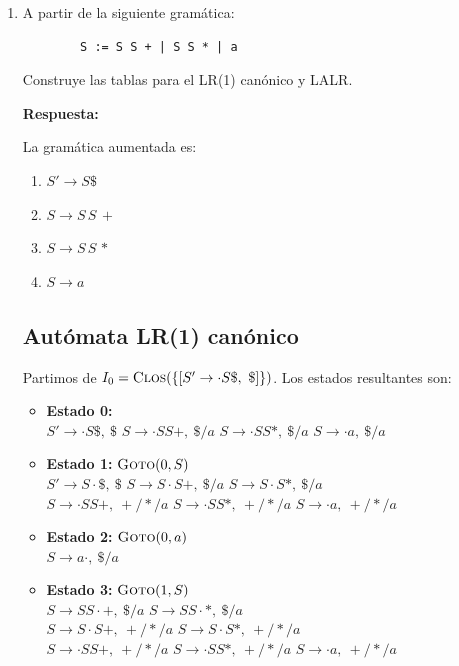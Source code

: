 \documentclass[12pt, letterpaper]{article}
\begin{document}
\begin{enumerate}
    \item A partir de la siguiente gramática:
    \begin{verbatim}
        S := S S + | S S * | a
    \end{verbatim}
    Construye las tablas para el LR(1) canónico y LALR.

    \textbf{Respuesta:}

La gramática aumentada es:
\begin{enumerate}[label=(\arabic*), start=0]
    \item $S' \to S\$$
    \item $S \to S\,S\,+$
    \item $S \to S\,S\,*$
    \item $S \to a$
\end{enumerate}

\subsection*{Autómata LR(1) canónico}

Partimos de $I_0=\textsc{Clos}(\{[S'\to\cdot S\$,\ \$]\})$. Los estados resultantes son:

\begin{itemize}
    \item \textbf{Estado 0:} \\
    $S' \to \cdot S\$,\ \$$ \quad $S \to \cdot SS+,\ \$/a$ \quad $S \to \cdot SS*,\ \$/a$ \quad $S \to \cdot a,\ \$/a$

    \item \textbf{Estado 1:} $\textsc{Goto}(0,S)$ \\
    $S' \to S\cdot\$,\ \$$ \quad $S \to S\cdot S+,\ \$/a$ \quad $S \to S\cdot S*,\ \$/a$ \\
    $S \to \cdot SS+,\ +/*/a$ \quad $S \to \cdot SS*,\ +/*/a$ \quad $S \to \cdot a,\ +/*/a$

    \item \textbf{Estado 2:} $\textsc{Goto}(0,a)$ \\
    $S \to a\cdot,\ \$/a$

    \item \textbf{Estado 3:} $\textsc{Goto}(1,S)$ \\
    $S \to SS\cdot +,\ \$/a$ \quad $S \to SS\cdot *,\ \$/a$ \\
    $S \to S\cdot S+,\ +/*/a$ \quad $S \to S\cdot S*,\ +/*/a$ \\
    $S \to \cdot SS+,\ +/*/a$ \quad $S \to \cdot SS*,\ +/*/a$ \quad $S \to \cdot a,\ +/*/a$


\end{itemize}
\end{enumerate}
\end{document}
